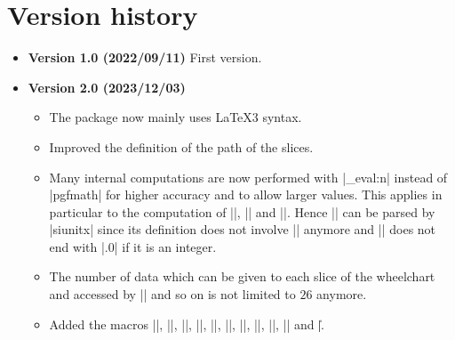 \documentclass[a4paper,english,dvipsnames]{ltxdoc}
\begin{document}
\section{Version history}
\begin{itemize}
\item[] \textbf{Version 1.0 (2022/09/11)} First version.
\item[] \textbf{Version 2.0 (2023/12/03)}
\begin{itemize}
\item The package now mainly uses \LaTeX3 syntax.
\item Improved the definition of the path of the slices.
\item Many internal computations are now performed with |\fp_eval:n| instead of |pgfmath| for higher accuracy and to allow larger values. This applies in particular to the computation of |\WCpercentage|, |\WCpercentagerounded| and |\WCtotalnum|. Hence |\WCpercentagerounded| can be parsed by |siunitx| since its definition does not involve |\pgfmathprintnumberto| anymore and |\WCtotalnum| does not end with |.0| if it is an integer.
\item The number of data which can be given to each slice of the wheelchart and accessed by |\WCvarA| and so on is not limited to $26$ anymore.
\item \begin{flushleft}Added the macros |\WCcountdiscrete|, |\WCetocthelinkedname|, |\WCetocthelinkednumber|, |\WCetocthelinkedpage|, |\WCetocthename|, |\WCetocthenumber|, |\WCetocthenumberofpages|, |\WCetocthepage|, |\WClegend|, |\WClist| and |\|.\end{flushleft}

\end{itemize}
\end{itemize}
\end{document}
